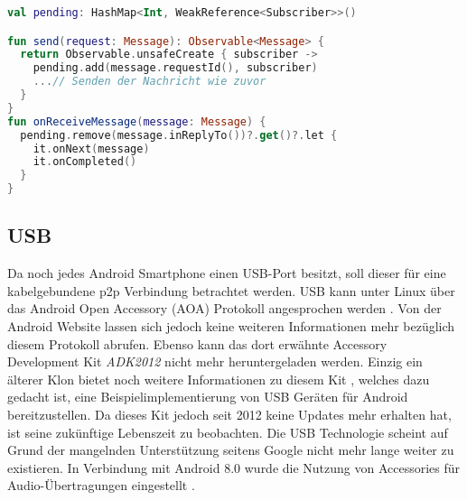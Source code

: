         \pagebreak
        \begin{lstlisting}[frame=bt, label={lst:nfc:apduAsync}, language=Kotlin, caption=Datenempfang über Observables (Clientcode in Kotlin)]
val pending: HashMap<Int, WeakReference<Subscriber>>()

fun send(request: Message): Observable<Message> {
  return Observable.unsafeCreate { subscriber ->
    pending.add(message.requestId(), subscriber)
    ...// Senden der Nachricht wie zuvor
  }
}
fun onReceiveMessage(message: Message) {
  pending.remove(message.inReplyTo())?.get()?.let {
    it.onNext(message)
    it.onCompleted()
  }
}
        \end{lstlisting}
        
    \subsection{USB}
        Da noch jedes Android Smartphone einen USB-Port besitzt, soll dieser für eine kabelgebundene p2p Verbindung betrachtet werden. USB kann unter Linux über das Android Open Accessory (AOA) Protokoll angesprochen werden \linebreak \cite{aoa}. Von der Android Website lassen sich jedoch keine weiteren Informationen mehr bezüglich diesem Protokoll abrufen. Ebenso kann das dort erwähnte Accessory Development Kit {\it ADK2012} nicht mehr heruntergeladen werden. Einzig ein älterer Klon bietet noch weitere Informationen zu diesem Kit \cite{mitADK}, welches dazu gedacht ist, eine Beispielimplementierung von USB Geräten für Android bereitzustellen. Da dieses Kit jedoch seit 2012 keine Updates mehr erhalten hat, ist seine zukünftige Lebenszeit zu beobachten. Die USB Technologie scheint auf Grund der mangelnden Unterstützung seitens Google nicht mehr lange weiter zu existieren. In Verbindung mit Android 8.0 wurde die Nutzung von Accessories für Audio-Übertragungen eingestellt \cite{aoa}.
        
